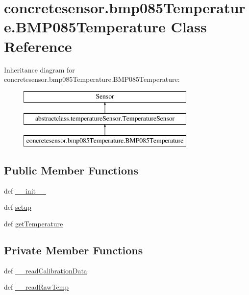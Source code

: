 \hypertarget{classconcretesensor_1_1bmp085Temperature_1_1BMP085Temperature}{}\section{concretesensor.\+bmp085\+Temperature.\+B\+M\+P085\+Temperature Class Reference}
\label{classconcretesensor_1_1bmp085Temperature_1_1BMP085Temperature}
Inheritance diagram for concretesensor.\+bmp085\+Temperature.\+B\+M\+P085\+Temperature\+:\begin{figure}[H]
\begin{center}
\leavevmode
\includegraphics[height=3.000000cm]{classconcretesensor_1_1bmp085Temperature_1_1BMP085Temperature}
\end{center}
\end{figure}
\subsection*{Public Member Functions}
\begin{DoxyCompactItemize}
\item 
def \hyperlink{classconcretesensor_1_1bmp085Temperature_1_1BMP085Temperature_a88aee9647437f9e336df75ee62995d94}{\+\_\+\+\_\+init\+\_\+\+\_\+}
\item 
def \hyperlink{classconcretesensor_1_1bmp085Temperature_1_1BMP085Temperature_a026edce2d15cf5828405517f810b59c6}{setup}
\item 
def \hyperlink{classconcretesensor_1_1bmp085Temperature_1_1BMP085Temperature_a8b170e3678e9f1e9c878e4bd21a176f1}{get\+Temperature}
\end{DoxyCompactItemize}
\subsection*{Private Member Functions}
\begin{DoxyCompactItemize}
\item 
def \hyperlink{classconcretesensor_1_1bmp085Temperature_1_1BMP085Temperature_acf2790bc0ce6ea96f284d5583a0d31bd}{\+\_\+\+\_\+read\+Calibration\+Data}
\item 
def \hyperlink{classconcretesensor_1_1bmp085Temperature_1_1BMP085Temperature_abbd42b560ed8d81427087741750412f1}{\+\_\+\+\_\+read\+Raw\+Temp}
\end{DoxyCompactItemize}
